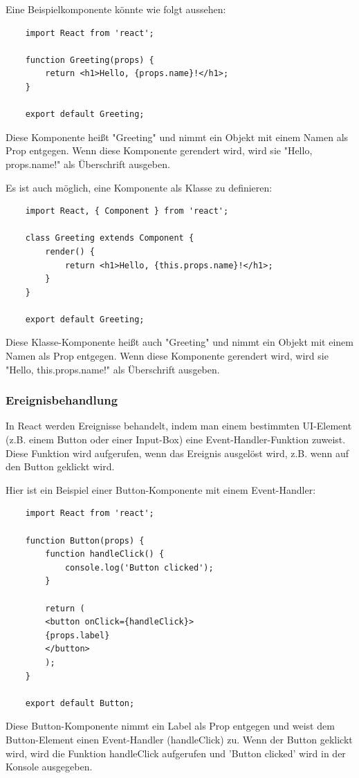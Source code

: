 Eine Beispielkomponente könnte wie folgt aussehen:

\begin{verbatim}
	import React from 'react';
	
	function Greeting(props) {
		return <h1>Hello, {props.name}!</h1>;
	}
	
	export default Greeting;
\end{verbatim}

Diese Komponente heißt "Greeting" und nimmt ein Objekt mit einem Namen als Prop entgegen. Wenn diese Komponente gerendert wird, wird sie "Hello, {props.name}!" als Überschrift ausgeben.

Es ist auch möglich, eine Komponente als Klasse zu definieren:

\begin{verbatim}
	import React, { Component } from 'react';
	
	class Greeting extends Component {
		render() {
			return <h1>Hello, {this.props.name}!</h1>;
		}
	}
	
	export default Greeting;
\end{verbatim}

Diese Klasse-Komponente heißt auch "Greeting" und nimmt ein Objekt mit einem Namen als Prop entgegen. Wenn diese Komponente gerendert wird, wird sie "Hello, {this.props.name}!" als Überschrift ausgeben.
\subsubsection{Ereignisbehandlung}
In React werden Ereignisse behandelt, indem man einem bestimmten UI-Element (z.B. einem Button oder einer Input-Box) eine Event-Handler-Funktion zuweist. Diese Funktion wird aufgerufen, wenn das Ereignis ausgelöst wird, z.B. wenn auf den Button geklickt wird.

Hier ist ein Beispiel einer Button-Komponente mit einem Event-Handler:

\begin{verbatim}
	import React from 'react';
	
	function Button(props) {
		function handleClick() {
			console.log('Button clicked');
		}
		
		return (
		<button onClick={handleClick}>
		{props.label}
		</button>
		);
	}
	
	export default Button;
\end{verbatim}

Diese Button-Komponente nimmt ein Label als Prop entgegen und weist dem Button-Element einen Event-Handler (handleClick) zu. Wenn der Button geklickt wird, wird die Funktion handleClick aufgerufen und 'Button clicked' wird in der Konsole ausgegeben.

